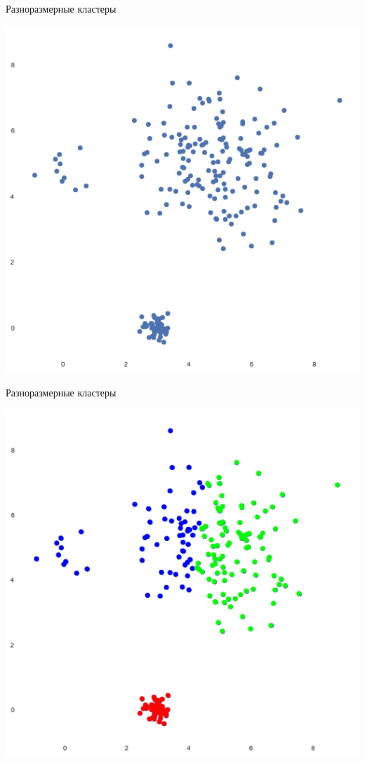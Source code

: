 \documentclass[10pt]{beamer}
\begin{document}
\begin{frame}{Разноразмерные кластеры}
	\begin{center}
	  \includegraphics[width=\textwidth, height=0.8 \textheight, keepaspectratio = true]{images/different_sizes-1}  
	\end{center}
\end{frame}

\begin{frame}{Разноразмерные кластеры}
	\begin{center}
	  \includegraphics[width=\textwidth, height=0.8 \textheight, keepaspectratio = true]{images/different_sizes-2}  
	\end{center}
\end{frame}
\end{document}
